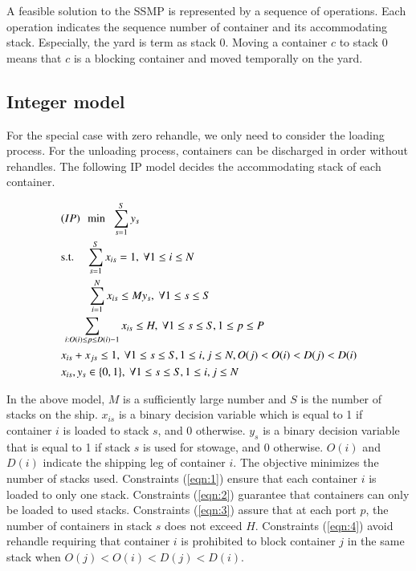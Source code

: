 \documentclass[review,3p,times,authoryear,12pt]{elsarticle}
\begin{document}
A feasible solution to the SSMP is represented by a sequence of operations. Each operation indicates the sequence number of container and its accommodating stack. Especially, the yard is term as stack 0. Moving a container $c$ to stack 0 means that $c$ is a blocking container and moved temporally on the yard.

\subsection{Integer model}
For the special case with zero rehandle, we only need to consider the loading process. For the unloading process, containers can be discharged in order without rehandles. The following IP model decides the accommodating stack of each container.
\begin{small}
\begin{align}
& (IP)~~\min\hspace{6pt}\sum_{s=1}^{S} y_s\notag\\
& \mathrm{s.t.}\hspace{11pt}\sum_{s=1}^{S} x_{is}=1, ~\forall 1\le i \le N \label{eqn:1}\\
& \hspace{24pt}\sum_{i=1}^{N} x_{is}\le M y_s, ~\forall 1\le s \le S	\label{eqn:2}\\
& \hspace{2pt}\sum_{i:O(i)\le p\le D(i)-1} x_{is}\le H, ~\forall 1\le s\le S, 1\le p\le P		\label{eqn:3}\\
& x_{is}+x_{js}\le 1, ~\forall 1\le s\le S, 1\le i,j\le N, O(j)<O(i)<D(j)<D(i)	\label{eqn:4}\\
& x_{is}, y_s \in \{0,1\}, ~\forall 1\le s\le S,1\le i,j\le N
\end{align}
\end{small}

In the above model, $M$ is a sufficiently large number and $S$ is the number of stacks on the ship.
$x_{is}$ is a binary decision variable which is equal to 1 if container $i$ is loaded to stack $s$, and 0 otherwise.
$y_s$ is a binary decision variable that is equal to 1 if stack $s$ is used for stowage, and 0 otherwise.
$O(i)$ and $D(i)$ indicate the shipping leg of container $i$.
The objective minimizes the number of stacks used.
Constraints (\ref{eqn:1}) ensure that each container $i$ is loaded to only one stack.
Constraints (\ref{eqn:2}) guarantee that containers can only be loaded to used stacks.
Constraints (\ref{eqn:3}) assure that at each port $p$, the number of containers in stack $s$ does not exceed $H$.
Constraints (\ref{eqn:4}) avoid rehandle requiring that container $i$ is prohibited to block container $j$ in the same stack when $O(j)<O(i)<D(j)<D(i)$.
\end{document}

